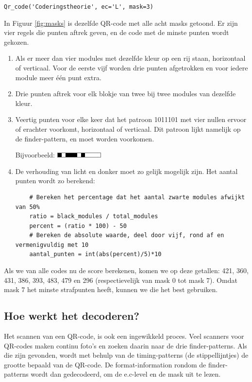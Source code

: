 \documentclass[a4paper]{article}
\begin{document}
\begin{verbatim}
Qr_code('Coderingstheorie', ec='L', mask=3)
\end{verbatim}

In Figuur \ref{fig:masks} is dezelfde QR-code met alle acht masks getoond. Er zijn vier regels die punten aftrek geven, en de code met de minste punten wordt gekozen.
\begin{enumerate}
    \item Als er meer dan vier modules met dezelfde kleur op een rij staan, horizontaal of verticaal. Voor de eerste vijf worden drie punten afgetrokken en voor iedere module meer één punt extra.
    \item Drie punten aftrek voor elk blokje van twee bij twee modules van dezelfde kleur.
    \item Veertig punten voor elke keer dat het patroon 1011101 met vier nullen ervoor of erachter voorkomt, horizontaal of verticaal. Dit patroon lijkt namelijk op de finder-pattern, en moet worden voorkomen.
    
    Bijvoorbeeld: \includegraphics[scale=.8]{pattern-1011101.png}
    \item De verhouding van licht en donker moet zo gelijk mogelijk zijn. Het aantal punten wordt zo berekend:
    \begin{verbatim}
    # Bereken het percentage dat het aantal zwarte modules afwijkt van 50%
    ratio = black_modules / total_modules
    percent = (ratio * 100) - 50
    # Bereken de absolute waarde, deel door vijf, rond af en vermenigvuldig met 10
    aantal_punten = int(abs(percent)/5)*10
    \end{verbatim}
\end{enumerate}
Als we van alle codes nu de score berekenen, komen we op deze getallen: 421, 360, 431, 386, 393, 483, 479 en 296 (respectievelijk van mask 0 tot mask 7). Omdat mask 7 het minste strafpunten heeft, kunnen we die het best gebruiken.
\subsection{Hoe werkt het decoderen?}
Het scannen van een QR-code, is ook een ingewikkeld proces. Veel scanners voor QR-codes maken continu foto's en zoeken daarin naar de drie finder-patterns. Als die zijn gevonden, wordt met behulp van de timing-patterns (de stippellijntjes) de grootte bepaald van de QR-code. De format-information rondom de finder-patterns wordt dan gedecodeerd, om de e.c-level en de mask uit te lezen.
\end{document}
